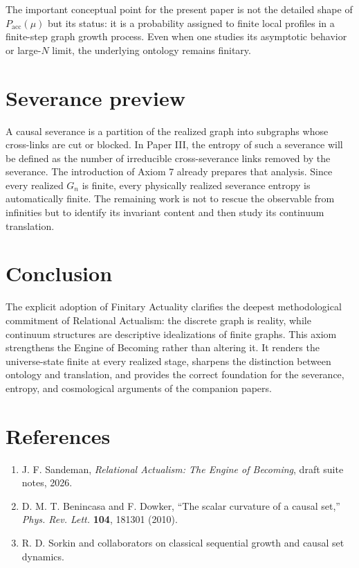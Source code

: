 \documentclass[11pt]{article}
\newcommand{\Pacc}{P_{\mathrm{acc}}}
\begin{document}
The important conceptual point for the present paper is not the detailed shape of $\Pacc(\mu)$ but its status: it is a probability assigned to finite local profiles in a finite-step graph growth process. Even when one studies its asymptotic behavior or large-$N$ limit, the underlying ontology remains finitary.

\section{Severance preview}
A causal severance is a partition of the realized graph into subgraphs whose cross-links are cut or blocked. In Paper III, the entropy of such a severance will be defined as the number of irreducible cross-severance links removed by the severance. The introduction of Axiom 7 already prepares that analysis. Since every realized $G_n$ is finite, every physically realized severance entropy is automatically finite. The remaining work is not to rescue the observable from infinities but to identify its invariant content and then study its continuum translation.

\section{Conclusion}
The explicit adoption of Finitary Actuality clarifies the deepest methodological commitment of Relational Actualism: the discrete graph is reality, while continuum structures are descriptive idealizations of finite graphs. This axiom strengthens the Engine of Becoming rather than altering it. It renders the universe-state finite at every realized stage, sharpens the distinction between ontology and translation, and provides the correct foundation for the severance, entropy, and cosmological arguments of the companion papers.

\section*{References}
\begin{enumerate}[leftmargin=1.5em]
\item J. F. Sandeman, \emph{Relational Actualism: The Engine of Becoming}, draft suite notes, 2026.
\item D. M. T. Benincasa and F. Dowker, ``The scalar curvature of a causal set,'' \emph{Phys. Rev. Lett.} \textbf{104}, 181301 (2010).
\item R. D. Sorkin and collaborators on classical sequential growth and causal set dynamics.
\end{enumerate}
\end{document}
